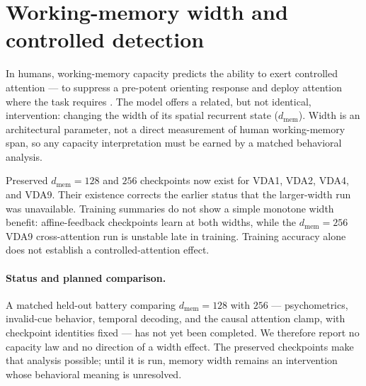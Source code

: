 \section{Working-memory width and controlled detection}
\label{sec:capacity}

In humans, working-memory capacity predicts the ability to exert controlled
attention --- to suppress a pre-potent orienting response and deploy attention where
the task requires \cite{kane2001_controlled_attention}. The model offers a related,
but not identical, intervention: changing the width of its spatial recurrent state
($d_{\mathrm{mem}}$). Width is an architectural parameter, not a direct measurement
of human working-memory span, so any capacity interpretation must be earned by a
matched behavioral analysis.

Preserved $d_{\mathrm{mem}}=128$ and $256$ checkpoints now exist for VDA1, VDA2,
VDA4, and VDA9. Their existence corrects the earlier status that the larger-width
run was unavailable. Training summaries do not show a simple monotone width benefit:
affine-feedback checkpoints learn at both widths, while the $d_{\mathrm{mem}}=256$
VDA9 cross-attention run is unstable late in training. Training accuracy alone does
not establish a controlled-attention effect.

\paragraph{Status and planned comparison.} A matched held-out battery comparing
$d_{\mathrm{mem}}=128$ with $256$ --- psychometrics, invalid-cue behavior, temporal
decoding, and the causal attention clamp, with checkpoint identities fixed --- has
not yet been completed. We therefore report no capacity law and no direction of a
width effect. The preserved checkpoints make that analysis possible; until it is
run, memory width remains an intervention whose behavioral meaning is unresolved.

